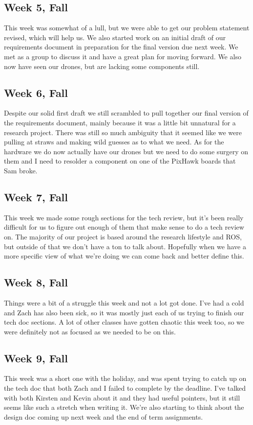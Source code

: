 \subsection{Week 5, Fall}
This week was somewhat of a lull, but we were able to get our problem statement revised, which will help us. We also started work on an initial draft of our requirements document in preparation for the final version due next week. We met as a group to discuss it and have a great plan for moving forward. We also now have seen our drones, but are lacking some components still.
\subsection{Week 6, Fall}
Despite our solid first draft we still scrambled to pull together our final version of the requirements document, mainly because it was a little bit unnatural for a research project. There was still so much ambiguity that it seemed like we were pulling at straws and making wild guesses as to what we need. As for the hardware we do now actually have our drones but we need to do some surgery on them and I need to resolder a component on one of the PixHawk boards that Sam broke.
\subsection{Week 7, Fall}
This week we made some rough sections for the tech review, but it's been really difficult for us to figure out enough of them that make sense to do a tech review on. The majority of our project is based around the research lifestyle and ROS, but outside of that we don't have a ton to talk about. Hopefully when we have a more specific view of what we're doing we can come back and better define this.
\subsection{Week 8, Fall}
Things were a bit of a struggle this week and not a lot got done. I've had a cold and Zach has also been sick, so it was mostly just each of us trying to finish our tech doc sections. A lot of other classes have gotten chaotic this week too, so we were definitely not as focused as we needed to be on this.
\subsection{Week 9, Fall}
This week was a short one with the holiday, and was spent trying to catch up on the tech doc that both Zach and I failed to complete by the deadline. I've talked with both Kirsten and Kevin about it and they had useful pointers, but it still seems like such a stretch when writing it. We're also starting to think about the design doc coming up next week and the end of term assignments.
